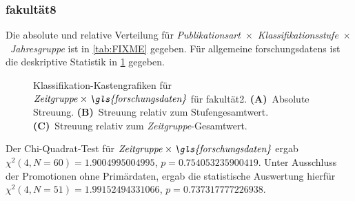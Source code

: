 \subsubsection{\gls{fakultät8}}
Die absolute und relative Verteilung für {\textit{Publikationsart}}~$\times$~{\textit{Klassifikationsstufe}}~$\times$~\textit{Jahresgruppe} ist in \cref{tab:FIXME} gegeben.
Für allgemeine \glspl{forschungsdaten} ist die deskriptive Statistik in \cref{fig:faculty_g_sampled_evaluated_adjusted_factors-only_Zeitgruppe_x_FD_absolute_boxplot} gegeben.
\begin{figure}[!htbp]
    \centering%
    \resizebox{.33\textwidth}{!}{}%
    \resizebox{.33\textwidth}{!}{}%
    \resizebox{.33\textwidth}{!}{}%
    \caption{Klassifikation-Kastengrafiken für $\text{\textit{Zeitgruppe}}\times\text{\textit{\gls{forschungsdaten}}}$ für \gls{fakultät2}. \textbf{(A)}~Absolute Streuung. \textbf{(B)}~Streuung relativ zum Stufengesamtwert. \textbf{(C)}~Streuung relativ zum \textit{Zeitgruppe}-Gesamtwert.}
    \label{fig:faculty_g_sampled_evaluated_adjusted_factors-only_Zeitgruppe_x_FD_absolute_boxplot}
\end{figure}
Der Chi-Quadrat-Test für $\text{\textit{Zeitgruppe}}\times\text{\textit{\gls{forschungsdaten}}}$ ergab $\chi^2 (\num{4}, N = \num{60}) = \num[round-mode=places,round-precision=3]{1.9004995004995}$, $p = \num[round-mode=places,round-precision=3]{0.754053235900419}$.
Unter Ausschluss der Promotionen ohne Primärdaten, ergab die statistische Auswertung hierfür $\chi^2 (\num{4}, N = \num{51}) = \num[round-mode=places,round-precision=3]{1.99152494331066}$, $p = \num[round-mode=places,round-precision=3]{0.737317777226938}$.

